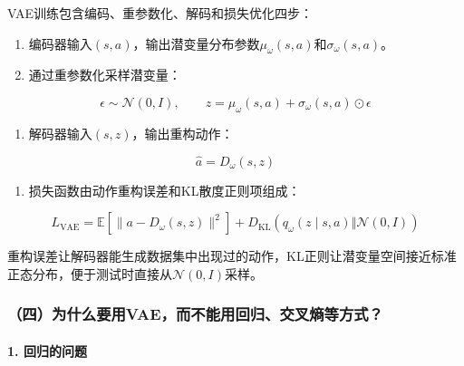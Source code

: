 VAE训练包含编码、重参数化、解码和损失优化四步：

\begin{enumerate}
\def\labelenumi{\arabic{enumi}.}
\tightlist
\item
  编码器输入\((s,a)\)，输出潜变量分布参数\(\mu_\omega(s,a)\)和\(\sigma_\omega(s,a)\)。
\item
{}
  通过重参数化采样潜变量：
\end{enumerate}

\[
\epsilon \sim \mathcal{N}(0,I), \qquad z=\mu_\omega(s,a)+\sigma_\omega(s,a)\odot\epsilon
\]

\begin{enumerate}
\def\labelenumi{\arabic{enumi}.}
\setcounter{enumi}{2}
\tightlist
\item
{}
  解码器输入\((s,z)\)，输出重构动作：
\end{enumerate}

\[
\hat a = D_\omega(s,z)
\]

\begin{enumerate}
\def\labelenumi{\arabic{enumi}.}
\setcounter{enumi}{3}
\tightlist
\item
{}
  损失函数由动作重构误差和KL散度正则项组成：
\end{enumerate}

\[
L_{\mathrm{VAE}}
=\mathbb{E}[\lVert a-D_\omega(s,z)\rVert^{2}]
+ D_{\mathrm{KL}}(q_\omega(z\mid s,a)\Vert \mathcal{N}(0,I))
\]

重构误差让解码器能生成数据集中出现过的动作，KL正则让潜变量空间接近标准正态分布，便于测试时直接从\(\mathcal{N}(0,I)\)采样。

\hypertarget{ux56dbux4e3aux4ec0ux4e48ux8981ux7528vaeux800cux4e0dux80fdux7528ux56deux5f52ux4ea4ux53c9ux71b5ux7b49ux65b9ux5f0f}{%
\subsubsection{（四）为什么要用VAE，而不能用回归、交叉熵等方式？}\label{ux56dbux4e3aux4ec0ux4e48ux8981ux7528vaeux800cux4e0dux80fdux7528ux56deux5f52ux4ea4ux53c9ux71b5ux7b49ux65b9ux5f0f}}

\hypertarget{ux56deux5f52ux7684ux95eeux9898}{%
\paragraph{1. 回归的问题}\label{ux56deux5f52ux7684ux95eeux9898}}

